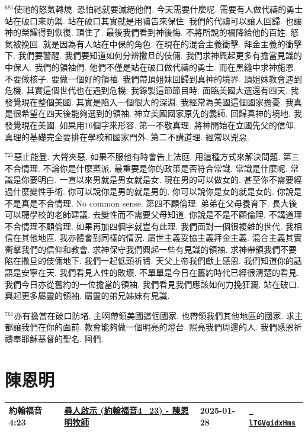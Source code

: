 \documentclass{book}
\begin{document}
$^{681}$使祂的怒氣轉燒.
恐怕祂就要滅絕他們.
今天需要什麼呢.
需要有人做代禱的勇士站在破口來防禦.
站在破口其實就是用禱告來保住.
我們的代禱可以讓人回歸.
也讓神的榮耀得到恢復.
頂住了.
最後我們看到神後悔.
不將所說的禍降給他的百姓.
怒氣被挽回.
就是因為有人站在中保的角色.
在現在的混合主義衝擊.
拜金主義的衝擊下.
我們要警醒.
我們要知道如何分辨撒旦的伎倆.
我們求神興起更多有擔當見識的中保人.
我們的領袖們.
他們不僅是站在破口做代禱的勇士.
而在黑縫中求神施恩.
不要做核子.
要做一個好的領袖.
我們帶頂姐妹回歸到真神的境界.
頂姐妹教會遇到危機.
其實這個世代也在遇到危機.
我錄製這節節目時.
面臨美國大選還有四天.
我發覺現在整個美國.
其實是陷入一個很大的深淵.
我經常為美國這個國家擔憂.
我真是很希望在四天後能夠選到的領袖.
神立美國國家原先的義師.
回歸真神的境地.
我發覺現在美國.
如果用16個字來形容.
第一不敬真理.
將神開始在立國先父的信仰.
真理的基礎完全要排在學校和國家門外.
第二不講道理.
經常以兇惡.

$^{721}$惡止能登.
大聲夾惡.
如果不服他有時會告上法庭.
用這種方式來解決問題.
第三不合情理.
不論你是什麼黨派.
最重要是你的政策是否符合常識.
常識是什麼呢.
常識是你要明白.
一直以來男就是男女就是女.
現在男的可以做女的.
甚至你不需要經過什麼變性手術.
你可以說你是男的就是男的.
你可以說你是女的就是女的.
你說是不是真是不合情理.
No common sense.
第四不顧倫理.
弟弟在父母養育下.
長大後可以聽學校的老師建議.
去變性而不需要父母知道.
你說是不是不顧倫理.
不講道理不合情理不顧倫理.
如果再加四個字就豈有此理.
我們面對一個很複雜的世代.
我相信在其他地區.
我亦體會到同樣的情況.
屬世主義妥協主義拜金主義.
混合主義其實衝擊我們的信仰和教會.
求神保守我們興起一些有見識的領袖.
求神帶領我們不要陷在撒旦的伎倆地下.
我們一起低頭祈禱.
天父上帝我們獻上感恩.
我們知道你的話語是安寧在天.
我們看見人性的敗壞.
不單單是今日在舊約時代已經很清楚的看見.
我們今日亦從舊約的一位擔當的領袖.
我們看見我們應該如何力挽狂瀾.
站在破口.
興起更多屬靈的領袖.
屬靈的弟兄姊妹有見識.

$^{761}$亦有擔當在破口防堵.
主啊帶領美國這個國家.
也帶領我們其他地區的國家.
求主都讓我們在你的面前.
教會能夠做一個明亮的燈台.
照亮我們周邊的人.
我們感恩祈禱奉耶穌基督的聖名.
阿們.
\newpage



\chapter{陳恩明}\label{ch:preacher9}
\begin{multicols}{3}
\minitoc
\end{multicols}
{ \scriptsize


\begin{xltabular}{\textwidth}{|p{0.15\textwidth} p{0.6\textwidth}|p{0.07\textwidth} p{0.1\textwidth}|}
\hline
約翰福音 4:23 & \hyperref[sec:lTGVgidxHms]{尋人啟示 (約翰福音4\_23) - 陳恩明牧師} & 2025-01-28 & \href{https://youtube.com/watch?v=lTGVgidxHms}{\texttt{ lTGVgidxHms}} \\
\hline
\end{xltabular}
}
\newpage
\end{document}
